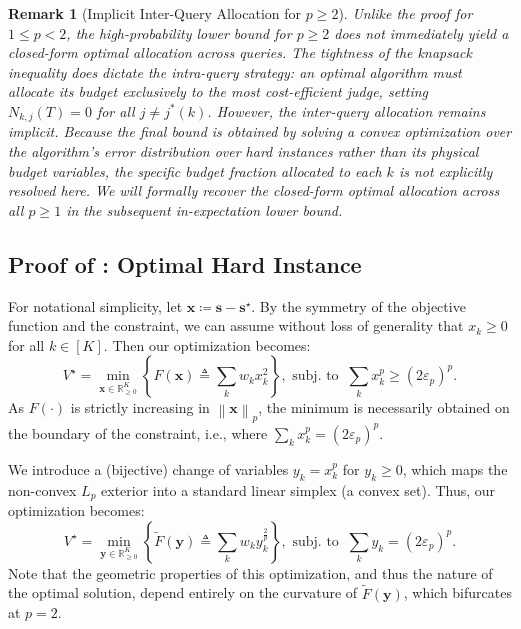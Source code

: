 \documentclass{article}
\def\vs{{\bm{s}}}
\def\vx{{\bm{x}}}
\def\vy{{\bm{y}}}
\def\sR{{\mathbb{R}}}
\theoremstyle{plain}
\theoremstyle{definition}
\theoremstyle{plain}
\newtheorem{remark}{Remark}
\newcommand{\bignorm}[1]{\left\lVert #1 \right\rVert}
\begin{document}
\begin{remark}[Implicit Inter-Query Allocation for $p \geq 2$]
    Unlike the proof for $1 \leq p < 2$, the high-probability lower bound for $p \geq 2$ does not immediately yield a closed-form optimal allocation across queries. The tightness of the knapsack inequality does dictate the \emph{intra-query} strategy: an optimal algorithm must allocate its budget exclusively to the most cost-efficient judge, setting $N_{k,j}(T) = 0$ for all $j \neq j^*(k)$. However, the \emph{inter-query} allocation remains implicit. Because the final bound is obtained by solving a convex optimization over the algorithm's error distribution over hard instances rather than its physical budget variables, the specific budget fraction allocated to each $k$ is not explicitly resolved here. We will formally recover the closed-form optimal allocation across all $p \geq 1$ in the subsequent in-expectation lower bound.
\end{remark}

\subsection{\texorpdfstring{Proof of : Optimal Hard Instance}{Proof of Lemma C.2: Optimal Hard Instance}}
\label{app:infimum-hard}
For notational simplicity, let $\vx \coloneq \vs - \vs^\star$.
By the symmetry of the objective function and the constraint, we can assume without loss of generality that $x_k \geq 0$ for all $k \in [K]$.
Then our optimization becomes:
\begin{equation}
    V^\star = \min_{\vx \in \sR_{\geq 0}^K} \left\{ F(\vx) \triangleq \sum_k w_k x_k^2 \right\}, \text{ subj. to } \  \sum_k x_k^p \geq (2\varepsilon_p)^p.
\end{equation}
As $F(\cdot)$ is strictly increasing in $\bignorm{\vx}_p$, the minimum is necessarily obtained on the boundary of the constraint, i.e., where $\sum_k x_k^p = (2\varepsilon_p)^p$.

We introduce a (bijective) change of variables $y_k = x_k^p$ for $y_k \geq 0$, which maps the non-convex $L_p$ exterior into a standard linear simplex (a convex set).
Thus, our optimization becomes:
\begin{equation}
    V^\star = \min_{\vy \in \sR_{\geq 0}^K} \left\{ \tilde{F}(\vy) \triangleq \sum_k w_k y_k^{\frac{2}{p}} \right\}, \text{ subj. to } \  \sum_k y_k = (2\varepsilon_p)^p.
\end{equation}
Note that the geometric properties of this optimization, and thus the nature of the optimal solution, depend entirely on the curvature of $\widetilde{F}(\vy)$, which bifurcates at $p = 2$.
\end{document}
